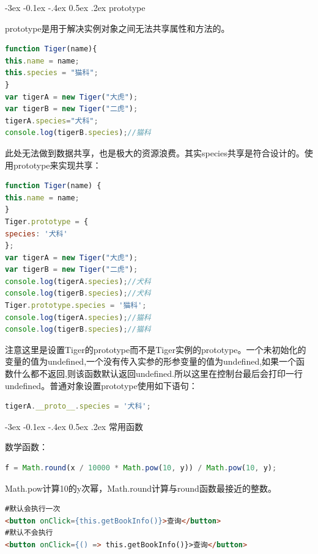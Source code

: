 \documentclass[11pt,fleqn]{book}
\makeatletter
\numberwithin{dummy}{section}
\theoremstyle{ocrenumbox}
\theoremstyle{blacknumex}
\theoremstyle{blacknumbox}
\theoremstyle{ocrenum}
\renewcommand{\subsection}{\@startsection {subsection}{2}{\z@}
	{-3ex \@plus -0.1ex \@minus -.4ex}
	{0.5ex \@plus.2ex }
	{\normalfont\sffamily\bfseries}}
\makeatother
\begin{document}
\subsection{prototype}

prototype是用于解决实例对象之间无法共享属性和方法的。

\begin{lstlisting}[language=Javascript]
function Tiger(name){
this.name = name;
this.species = "猫科";
}
var tigerA = new Tiger("大虎");
var tigerB = new Tiger("二虎");
tigerA.species="犬科";
console.log(tigerB.species);//猫科
\end{lstlisting}

此处无法做到数据共享，也是极大的资源浪费。其实species共享是符合设计的。使用prototype来实现共享：

\begin{lstlisting}[language=Javascript]
function Tiger(name) {
this.name = name;
}
Tiger.prototype = {
species: '犬科'
};
var tigerA = new Tiger("大虎");
var tigerB = new Tiger("二虎");
console.log(tigerA.species);//犬科
console.log(tigerB.species);//犬科
Tiger.prototype.species = '猫科';
console.log(tigerA.species);//猫科
console.log(tigerB.species);//猫科
\end{lstlisting}

注意这里是设置Tiger的prototype而不是Tiger实例的prototype。一个未初始化的变量的值为undefined,一个没有传入实参的形参变量的值为undefined,如果一个函数什么都不返回,则该函数默认返回undefined.所以这里在控制台最后会打印一行undefined。普通对象设置prototype使用如下语句：

\begin{lstlisting}[language=Javascript]
tigerA.__proto__.species = '犬科';
\end{lstlisting}

\subsection{常用函数}

数学函数：

\begin{lstlisting}[language=Javascript]
f = Math.round(x / 10000 * Math.pow(10, y)) / Math.pow(10, y);
\end{lstlisting}

Math.pow计算10的y次幂，Math.round计算与round函数最接近的整数。

\begin{lstlisting}[language=HTML]
#默认会执行一次
<button onClick={this.getBookInfo()}>查询</button>
#默认不会执行
<button onClick={() => this.getBookInfo()}>查询</button>
\end{lstlisting}
\end{document}
